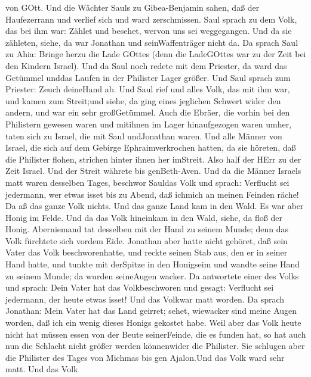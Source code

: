 von GOtt.  Und die Wächter Sauls zu Gibea-Benjamin sahen,
daß der Haufezerrann und verlief sich und ward zerschmissen.
 Saul sprach zu dem Volk, das bei ihm war: Zählet und
besehet, wervon uns sei weggegangen. Und da sie zähleten, siehe, da war
Jonathan und seinWaffenträger nicht da.  Da sprach Saul zu
Ahia: Bringe herzu die Lade GOttes (denn die LadeGOttes war zu der Zeit
bei den Kindern Israel).  Und da Saul noch redete mit dem
Priester, da ward das Getümmel unddas Laufen in der Philister Lager
größer. Und Saul sprach zum Priester: Zeuch deineHand ab. 
Und Saul rief und alles Volk, das mit ihm war, und kamen zum Streit;und
siehe, da ging eines jeglichen Schwert wider den andern, und war ein
sehr großGetümmel.  Auch die Ebräer, die vorhin bei den
Philistern gewesen waren und mitihnen im Lager hinaufgezogen waren
umher, taten sich zu Israel, die mit Saul undJonathan waren.
 Und alle Männer von Israel, die sich auf dem Gebirge
Ephraimverkrochen hatten, da sie höreten, daß die Philister flohen,
strichen hinter ihnen her imStreit.  Also half der HErr zu
der Zeit Israel. Und der Streit währete bis genBeth-Aven. 
Und da die Männer Israels matt waren desselben Tages, beschwor Sauldas
Volk und sprach: Verflucht sei jedermann, wer etwas isset bis zu Abend,
daß ichmich an meinen Feinden räche! Da aß das ganze Volk nichts.
 Und das ganze Land kam in den Wald. Es war aber Honig im
Felde.  Und da das Volk hineinkam in den Wald, siehe, da
floß der Honig. Aberniemand tat desselben mit der Hand zu seinem Munde;
denn das Volk fürchtete sich vordem Eide.  Jonathan aber
hatte nicht gehöret, daß sein Vater das Volk beschworenhatte, und reckte
seinen Stab aus, den er in seiner Hand hatte, und tunkte mit derSpitze
in den Honigseim und wandte seine Hand zu seinem Munde; da wurden
seineAugen wacker.  Da antwortete einer des Volks und
sprach: Dein Vater hat das Volkbeschworen und gesagt: Verflucht sei
jedermann, der heute etwas isset! Und das Volkwar matt worden.
 Da sprach Jonathan: Mein Vater hat das Land geirret;
sehet, wiewacker sind meine Augen worden, daß ich ein wenig dieses
Honigs gekostet habe.  Weil aber das Volk heute nicht hat
müssen essen von der Beute seinerFeinde, die es funden hat, so hat auch
nun die Schlacht nicht größer werden könnenwider die Philister.
 Sie schlugen aber die Philister des Tages von Michmas bis
gen Ajalon.Und das Volk ward sehr matt.  Und das Volk

